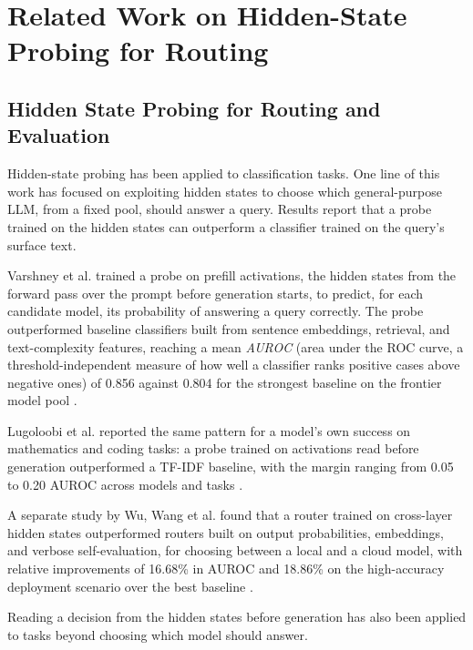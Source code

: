 \section{Related Work on Hidden-State Probing for Routing}
\label{sec:related-work-routing}

\subsection{Hidden State Probing for Routing and Evaluation}
\label{subsec:hidden-state-probing}

Hidden-state probing has been applied to classification tasks. One line of this work has focused on exploiting hidden states to choose which general-purpose LLM, from a fixed pool, should answer a query. Results report that a probe trained on the hidden states can outperform a classifier trained on the query's surface text.

Varshney et al. trained a probe on prefill activations, the hidden states from the forward pass over the prompt before generation starts, to predict, for each candidate model, its probability of answering a query correctly. The probe outperformed baseline classifiers built from sentence embeddings, retrieval, and text-complexity features, reaching a mean \emph{AUROC} (area under the ROC curve, a threshold-independent measure of how well a classifier ranks positive cases above negative ones) of 0.856 against 0.804 for the strongest baseline on the frontier model pool \cite{varshneyLLMRouterRethinking2026}.

Lugoloobi et al. reported the same pattern for a model's own success on mathematics and coding tasks: a probe trained on activations read before generation outperformed a TF-IDF baseline, with the margin ranging from 0.05 to 0.20 AUROC across models and tasks \cite{lugoloobiLLMsEncodeTheir2026}.

A separate study by Wu, Wang et al. found that a router trained on cross-layer hidden states outperformed routers built on output probabilities, embeddings, and verbose self-evaluation, for choosing between a local and a cloud model, with relative improvements of 16.68\% in AUROC and 18.86\% on the high-accuracy deployment scenario over the best baseline \cite{wuFairComprehensiveEvaluation2026}.

Reading a decision from the hidden states before generation has also been applied to tasks beyond choosing which model should answer.

